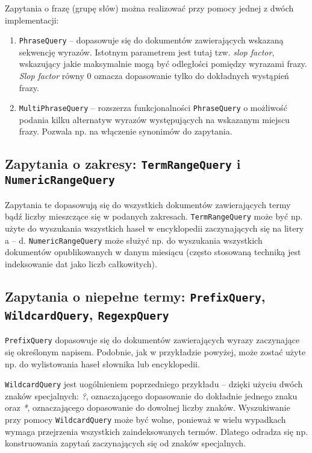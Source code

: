 Zapytania o frazę (grupę słów) można realizować przy pomocy jednej z dwóch implementacji:
\begin{enumerate}
 \item \texttt{PhraseQuery} -- dopasowuje się do dokumentów zawierających wskazaną sekwencję wyrazów. Istotnym parametrem jest tutaj tzw. \emph{slop factor}, wskazujący jakie maksymalnie mogą być odległości pomiędzy wyrazami frazy. \emph{Slop factor} równy 0 oznacza dopasowanie tylko do dokładnych wystąpień frazy. 
 \item \texttt{MultiPhraseQuery} -- rozszerza funkcjonalności \texttt{PhraseQuery} o możliwość podania kilku alternatyw wyrazów występujących na wskazanym miejscu frazy. Pozwala np. na włączenie synonimów do zapytania. 
\end{enumerate}

\subsection{Zapytania o zakresy: \texttt{TermRangeQuery} i \texttt{NumericRangeQuery}}

Zapytania te dopasowują się do wszystkich dokumentów zawierających termy bądź liczby mieszczące się w podanych zakresach. \texttt{TermRangeQuery} może być np. użyte do wyszukania wszystkich haseł w encyklopedii zaczynających się na litery a -- d. \texttt{NumericRangeQuery} może służyć np. do wyszukania wszystkich dokumentów opublikowanych w danym miesiącu (często stosowaną techniką jest indeksowanie dat jako liczb całkowitych).

\subsection{Zapytania o niepełne termy: \texttt{PrefixQuery}, \texttt{WildcardQuery}, \texttt{RegexpQuery}}

\texttt{PrefixQuery} dopasowuje się do dokumentów zawierających wyrazy zaczynające się określonym napisem. Podobnie, jak w przykładzie powyżej, może zostać użyte np. do wylistowania haseł słownika lub encyklopedii.

\texttt{WildcardQuery} jest uogólnieniem poprzedniego przykładu -- dzięki użyciu dwóch znaków specjalnych: \emph{?}, oznaczającego dopasowanie do dokładnie jednego znaku oraz \emph{*}, oznaczającego dopasowanie do dowolnej liczby znaków. Wyszukiwanie przy pomocy \texttt{WildcardQuery} może być wolne, ponieważ w wielu wypadkach wymaga przejrzenia wszystkich zaindeksowanych termów. Dlatego odradza się np. konstruowania zapytań zaczynających się od znaków specjalnych.

